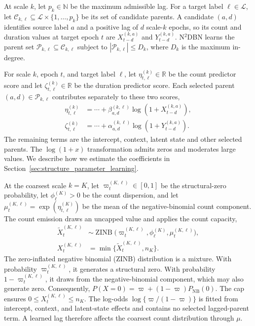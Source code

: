\documentclass[sigconf]{acmart}
\begin{document}
At scale \(k\), let \(p_k\in\mathbb N\) be the maximum admissible lag. For a target label \(\ell\in\mathcal L\), let \(\mathcal C_{k,\ell}\subseteq\mathcal L\times\{1,\ldots,p_k\}\) be its set of candidate parents. A candidate \((a,d)\) identifies source label \(a\) and a positive lag of \(d\) scale-\(k\) epochs, so its count and duration values at target epoch \(t\) are \(X_{t-d}^{(k,a)}\) and \(Y_{t-d}^{(k,a)}\). N$^2$DBN learns the parent set \(\mathcal P_{k,\ell}\subseteq\mathcal C_{k,\ell}\) subject to \(|\mathcal P_{k,\ell}|\leq D_k\), where \(D_k\) is the maximum in-degree.

For scale \(k\), epoch \(t\), and target label \(\ell\), let \(\eta_{t,\ell}^{(k)}\in\mathbb R\) be the count predictor score and let \(\zeta_{t,\ell}^{(k)}\in\mathbb R\) be the duration predictor score. Each selected parent \((a,d)\in\mathcal P_{k,\ell}\) contributes separately to these two scores,
\begin{align}
  \eta_{t,\ell}^{(k)}
  &=\cdots+\beta_{a,d}^{(k,\ell)}
  \log(1+X_{t-d}^{(k,a)}),
  \nonumber\\
  \zeta_{t,\ell}^{(k)}
  &=\cdots+\alpha_{a,d}^{(k,\ell)}
  \log(1+Y_{t-d}^{(k,a)}).
  \label{eq:lagged_parent_terms}
\end{align}
The remaining terms are the intercept, context, latent state and other selected parents. The \(\log(1+x)\) transformation admits zeros and moderates large values. We describe how we estimate the coefficients in Section~\ref{sec:structure_parameter_learning}.

At the coarsest scale \(k=K\), let \(\varpi_t^{(K,\ell)}\in[0,1]\) be the structural-zero probability, let \(\phi_\ell^{(K)}>0\) be the count dispersion, and let \(\mu_t^{(K,\ell)}=\exp(\eta_{t,\ell}^{(K)})\) be the mean of the negative-binomial count component. The count emission draws an uncapped value and applies the count capacity,
\begin{equation}
  \begin{aligned}
    \widetilde X_t^{(K,\ell)}&\sim\operatorname{ZINB}
    \bigl(\varpi_t^{(K,\ell)},\phi_\ell^{(K)},
    \mu_t^{(K,\ell)}\bigr),\\
    X_t^{(K,\ell)}&=\min\{\widetilde X_t^{(K,\ell)},n_K\}.
  \end{aligned}
  \label{eq:coarsest_zinb}
\end{equation}
The zero-inflated negative binomial (ZINB) distribution is a mixture. With probability \(\varpi_t^{(K,\ell)}\), it generates a structural zero. With probability \(1-\varpi_t^{(K,\ell)}\), it draws from the negative-binomial component, which may also generate zero. Consequently, \(P(X=0)=\varpi+(1-\varpi)P_{\mathrm{NB}}(0)\). The cap ensures \(0\leq X_t^{(K,\ell)}\leq n_K\). The log-odds \(\log\{\varpi/(1-\varpi)\}\) is fitted from intercept, context, and latent-state effects and contains no selected lagged-parent term. A learned lag therefore affects the coarsest count distribution through \(\mu\).
\end{document}
